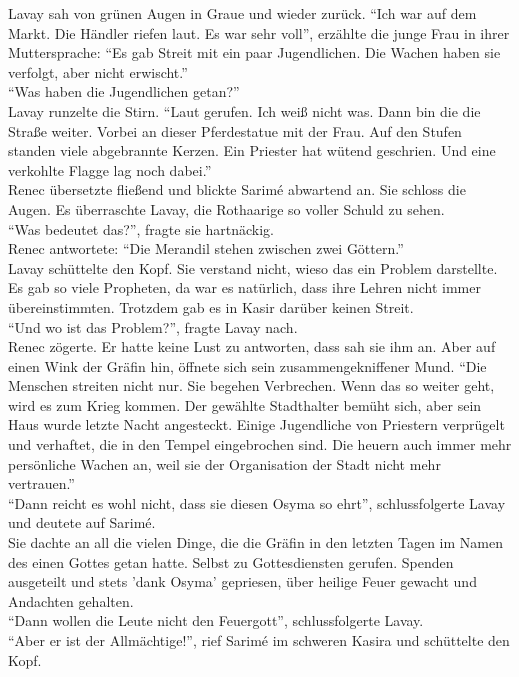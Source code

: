 Lavay sah von grünen Augen in Graue und wieder zurück. ``Ich war auf dem Markt. Die Händler riefen 
laut. Es war sehr voll'', erzählte die junge Frau in ihrer Muttersprache: ``Es gab Streit mit ein 
paar Jugendlichen. Die Wachen haben sie verfolgt, aber nicht erwischt.''\\
``Was haben die Jugendlichen getan?''\\
Lavay runzelte die Stirn. ``Laut gerufen. Ich weiß nicht was. Dann bin die die Straße weiter. 
Vorbei an dieser Pferdestatue mit der Frau. Auf den Stufen standen viele abgebrannte Kerzen. Ein 
Priester hat wütend geschrien. Und eine verkohlte Flagge lag noch dabei.''\\
Renec übersetzte fließend und blickte Sarimé abwartend an. Sie schloss die Augen. Es überraschte 
Lavay, die Rothaarige so voller Schuld zu sehen.\\
``Was bedeutet das?'', fragte sie hartnäckig.\\
Renec antwortete: ``Die Merandil stehen zwischen zwei Göttern.''\\
Lavay schüttelte den Kopf. Sie verstand nicht, wieso das ein Problem darstellte. Es gab so viele 
Propheten, da war es natürlich, dass ihre Lehren nicht immer übereinstimmten. Trotzdem gab es 
in Kasir darüber keinen Streit.\\
``Und wo ist das Problem?'', fragte Lavay nach.\\
Renec zögerte. Er hatte keine Lust zu antworten, dass sah sie ihm an. Aber auf einen Wink der 
Gräfin hin, öffnete sich sein zusammengekniffener Mund. ``Die Menschen streiten nicht nur. Sie 
begehen Verbrechen. Wenn das so weiter geht, wird es zum Krieg kommen. Der gewählte Stadthalter 
bemüht sich, aber sein Haus wurde letzte Nacht angesteckt. Einige Jugendliche von Priestern 
verprügelt und verhaftet, die in den Tempel eingebrochen sind. Die heuern auch immer mehr 
persönliche Wachen an, weil sie der Organisation der Stadt nicht mehr vertrauen.''\\
``Dann reicht es wohl nicht, dass sie diesen Osyma so ehrt'', schlussfolgerte Lavay und deutete auf 
Sarimé.\\
Sie dachte an all die vielen Dinge, die die Gräfin in den letzten Tagen im Namen des einen Gottes 
getan hatte. Selbst zu Gottesdiensten gerufen. Spenden ausgeteilt und stets 'dank Osyma' 
gepriesen, über heilige Feuer gewacht und Andachten gehalten.\\
``Dann wollen die Leute nicht den Feuergott'', schlussfolgerte Lavay.\\
``Aber er ist der Allmächtige!'', rief Sarimé im schweren Kasira und schüttelte den Kopf.\\
